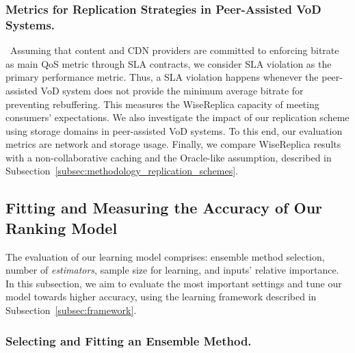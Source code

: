 \subsubsection{Metrics for Replication Strategies in Peer-Assisted VoD Systems.} 

\ Assuming that content and CDN providers are committed to enforcing bitrate as main QoS metric through SLA contracts, we consider SLA violation as the primary performance metric. Thus, a SLA violation happens whenever the peer-assisted VoD system does not provide the minimum average bitrate for preventing rebuffering. This measures the WiseReplica capacity of meeting consumers' expectations. We also investigate the impact of our replication scheme using storage domains in peer-assisted VoD systems. To this end, our evaluation metrics are network and storage usage. Finally, we compare WiseReplica results with a non-collaborative caching and the Oracle-like assumption, described in Subsection~\ref{subsec:methodology_replication_schemes}. 

\subsection{Fitting and Measuring the Accuracy of Our Ranking Model}
\label{subsec:prediction_performance}

The evaluation of our learning model comprises: ensemble method selection, number of \emph{estimators},  sample size for learning, and inputs' relative importance. In this subsection, we aim to evaluate the most important settings and tune our model towards higher accuracy, using the learning framework described in Subsection~\ref{subsec:framework}.

\subsubsection{Selecting and Fitting an Ensemble Method.}

